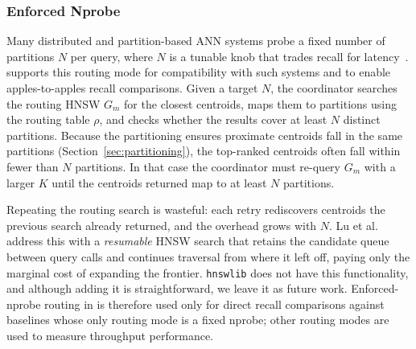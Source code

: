 \documentclass[sigconf,review,anonymous]{acmart}
\begin{document}
\subsubsection{Enforced Nprobe}
    \label{sec:enforced-nprobe}
    Many distributed and partition-based ANN systems probe a fixed number of partitions $N$ per query, where $N$ is a tunable knob that trades recall for latency~\cite{gottensuren2025unleashing, mohoney2025quake, jegou2011searching, chen2021spann}. \SystemName{} supports this routing mode for compatibility with such systems and to enable apples-to-apples recall comparisons. Given a target $N$, the coordinator searches the routing HNSW $G_m$ for the closest centroids, maps them to partitions using the routing table $\rho$, and checks whether the results cover at least $N$ distinct partitions. Because the partitioning ensures proximate centroids fall in the same partitions (Section~\ref{sec:partitioning}), the top-ranked centroids often fall within fewer than $N$ partitions. In that case the coordinator must re-query $G_m$ with a larger $K$ until the centroids returned map to at least $N$ partitions.
    
    Repeating the routing search is wasteful: each retry rediscovers centroids the previous search already returned, and the overhead grows with $N$. Lu et al.~\cite{lu2026depth} address this with a \emph{resumable} HNSW search that retains the candidate queue between query calls and continues traversal from where it left off, paying only the marginal cost of expanding the frontier. \texttt{hnswlib} does not have this functionality, and although adding it is straightforward, we leave it as future work. Enforced-nprobe routing in \SystemName{} is therefore used only for direct recall comparisons against baselines whose only routing mode is a fixed nprobe; other routing modes are used to measure throughput performance. 

\end{document}
